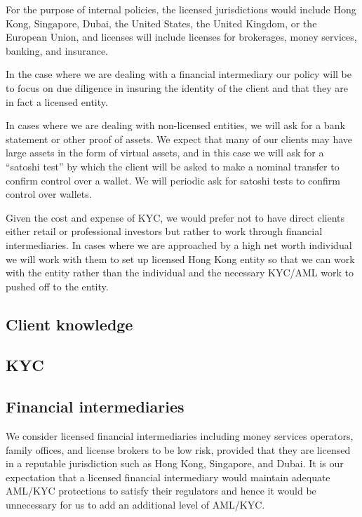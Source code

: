 For the purpose of internal policies, the licensed jurisdictions would
include Hong Kong, Singapore, Dubai, the United States, the United
Kingdom, or the European Union, and licenses will include licenses for
brokerages, money services, banking, and insurance.

In the case where we are dealing with a financial intermediary our
policy will be to focus on due diligence in insuring the identity of
the client and that they are in fact a licensed entity.

In cases where we are dealing with non-licensed entities, we will ask
for a bank statement or other proof of assets.  We expect that many of
our clients may have large assets in the form of virtual assets, and
in this case we will ask for a ``satoshi test'' by which the client
will be asked to make a nominal transfer to confirm control over a
wallet.  We will periodic ask for satoshi tests to confirm control
over wallets.

Given the cost and expense of KYC, we would prefer not to have direct
clients either retail or professional investors but rather to work
through financial intermediaries.  In cases where we are approached by
a high net worth individual we will work with them to set up licensed
Hong Kong entity so that we can work with the entity rather than the
individual and the necessary KYC/AML work to pushed off to the entity.

\subsection{Client knowledge}


\subsection{KYC}

\subsection{Financial intermediaries}
We consider licensed financial intermediaries including money services
operators, family offices, and license brokers to be low risk,
provided that they are licensed in a reputable jurisdiction such as
Hong Kong, Singapore, and Dubai.  It is our expectation that a
licensed financial intermediary would maintain adequate AML/KYC
protections to satisfy their regulators and hence it would be
unnecessary for us to add an additional level of AML/KYC.

